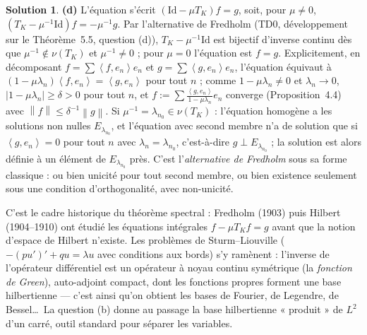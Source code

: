 \documentclass[11pt,a4paper]{article}
\newcommand{\norm}[1]{\left\|#1\right\|}
\newcommand{\ps}[2]{\left\langle #1,#2\right\rangle}
\newcommand{\ie}{c'est-à-dire}
\theoremstyle{definition}
\newtheorem*{solution}{Solution}
\begin{document}
\begin{solution}
\medskip
\noindent\textbf{(d)} L'équation s'écrit $(\mathrm{Id}-\mu T_K)f=g$, soit, pour $\mu\ne0$, $(T_K-\mu^{-1}\mathrm{Id})f=-\mu^{-1}g$. Par l'alternative de Fredholm (TD0, développement sur le Théorème~5.5, question (d)), $T_K-\mu^{-1}\mathrm{Id}$ est bijectif d'inverse continu dès que $\mu^{-1}\notin\nu(T_K)$ et $\mu^{-1}\ne0$ ; pour $\mu=0$ l'équation est $f=g$. Explicitement, en décomposant $f=\sum\ps f{e_n}e_n$ et $g=\sum\ps g{e_n}e_n$, l'équation équivaut à $(1-\mu\lambda_n)\ps f{e_n}=\ps g{e_n}$ pour tout $n$ ; comme $1-\mu\lambda_n\ne0$ et $\lambda_n\to0$, $|1-\mu\lambda_n|\ge\delta>0$ pour tout $n$, et $f:=\sum\frac{\ps g{e_n}}{1-\mu\lambda_n}e_n$ converge (Proposition~4.4) avec $\norm f\le\delta^{-1}\norm g$. Si $\mu^{-1}=\lambda_{n_0}\in\nu(T_K)$ : l'équation homogène a les solutions non nulles $E_{\lambda_{n_0}}$, et l'équation avec second membre n'a de solution que si $\ps g{e_n}=0$ pour tout $n$ avec $\lambda_n=\lambda_{n_0}$, \ie{} $g\perp E_{\lambda_{n_0}}$ ; la solution est alors définie à un élément de $E_{\lambda_{n_0}}$ près. C'est l'\emph{alternative de Fredholm} sous sa forme classique : ou bien unicité pour tout second membre, ou bien existence seulement sous une condition d'orthogonalité, avec non-unicité.
\end{solution}

\begin{commentaire}
C'est le cadre historique du théorème spectral : Fredholm (1903) puis Hilbert (1904--1910) ont étudié les équations intégrales $f-\mu T_Kf=g$ avant que la notion d'espace de Hilbert n'existe. Les problèmes de Sturm--Liouville ($-(pu')'+qu=\lambda u$ avec conditions aux bords) s'y ramènent : l'inverse de l'opérateur différentiel est un opérateur à noyau continu symétrique (la \emph{fonction de Green}), auto-adjoint compact, dont les fonctions propres forment une base hilbertienne — c'est ainsi qu'on obtient les bases de Fourier, de Legendre, de Bessel\dots\ La question (b) donne au passage la base hilbertienne « produit » de $L^2$ d'un carré, outil standard pour séparer les variables.
\end{commentaire}
\end{document}
